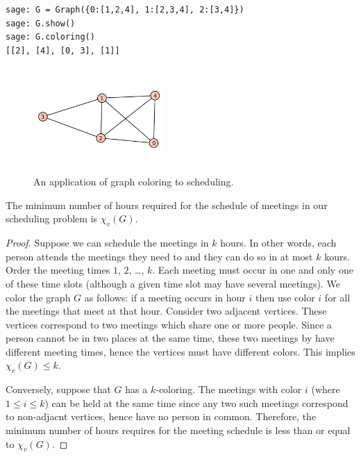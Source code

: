 \begin{lstlisting}
sage: G = Graph({0:[1,2,4], 1:[2,3,4], 2:[3,4]})
sage: G.show()
sage: G.coloring()
[[2], [4], [0, 3], [1]]
\end{lstlisting}

\begin{figure}[h!]
\begin{center}
\includegraphics[height=4cm,width=5cm]{image/graph-coloring/graph-coloring-scheduling}
\end{center}
\caption{An application of graph coloring to scheduling.}
\label{fig:graph_coloring:scheduling}
\end{figure}

\begin{theorem}
The minimum number of hours required for the schedule of meetings in
our scheduling problem is $\chi_v(G)$.
\end{theorem}

\begin{proof}

Suppose we can schedule the meetings in $k$ hours. In other words,
each person attends the meetings they need to and they
can do so in at most $k$ kours. Order the meeting
times $1$, $2$, \dots, $k$. Each meeting must occur in one and only
one of these time slots (although a given time slot may have
several meetings). We color the graph $G$ as follows:
if a meeting occurs in hour $i$ then use color $i$ for all the
meetings that meet at that hour. Consider two adjacent
vertices. These vertices correspond to two meetings which
share one or more people. Since a person cannot be in two places at
the same time, these two meetings by have different meeting times,
hence the vertices must have different colors. This implies
$\chi_v(G)\leq k$.

Conversely, suppose that $G$ has a $k$-coloring.
The meetings with color $i$ (where $1\leq i\leq k$)
can be held at the same time since any two such meetings
correspond to non-adjacnt vertices, hence have no
person in common. Therefore, the minimum number of
hours requires for the meeting schedule is less than
or equal to $\chi_v(G)$.
\end{proof}


